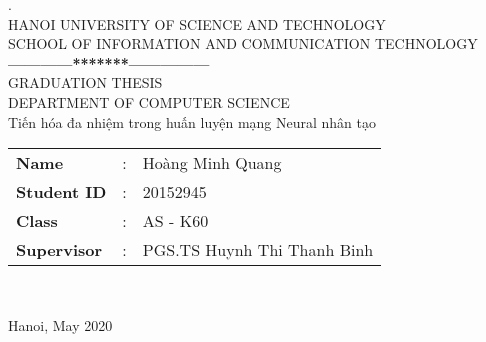 \thispagestyle{empty}

\thisfancypage{
  \setlength{\fboxrule}{1pt}
  \doublebox}{}
\begin{center}

{
. \\
{\fontsize{12}{12}\selectfont HANOI UNIVERSITY OF SCIENCE AND TECHNOLOGY\\ SCHOOL OF INFORMATION AND COMMUNICATION TECHNOLOGY}\\
\textbf{------------*******---------------}\\[2.5cm]

{\fontsize{25}{43}\selectfont GRADUATION THESIS}\\[0.1cm]
{\fontsize{17}{10}\selectfont DEPARTMENT OF COMPUTER SCIENCE}\\[0.9cm]
{\fontsize{20}{26}\selectfont Tiến hóa đa nhiệm trong huấn luyện mạng Neural nhân tạo}\\[2.5cm]

\begin{tabular}{l c l}
  \textbf{Name} & : & Hoàng Minh Quang \\ 
  \textbf{Student ID} & : & 20152945  \\ 
  \textbf{Class} & : & AS - K60  \\
  \textbf{Supervisor} & : &  PGS.TS Huynh Thi Thanh Binh  \\
\end{tabular} \\[2.5cm]
}

\fontsize{17}{19}\selectfont Hanoi, May 2020
\end{center}
\pagebreak